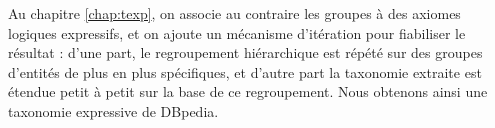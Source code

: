 Au chapitre \ref{chap:texp}, on associe au contraire les groupes à des axiomes logiques expressifs, et on ajoute un mécanisme d'itération pour fiabiliser le résultat : d'une part, le regroupement hiérarchique est répété sur des groupes d'entités de plus en plus spécifiques, et d'autre part la taxonomie extraite est étendue petit à petit sur la base de ce regroupement. Nous obtenons ainsi une taxonomie expressive de DBpedia.





